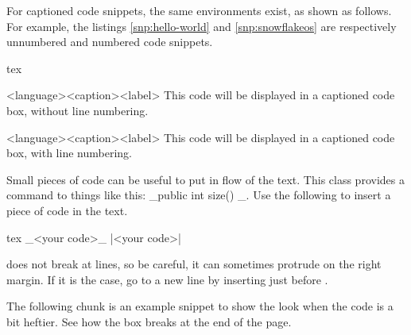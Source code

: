 \documentclass[
	raggedright,
	twoside,
	12pt,
	colorful,
]{tufte-style-article}
\begin{document}
For captioned code snippets, the same environments exist, as shown as follows. For example, the listings \ref{snp:hello-world} and \ref{snp:snowflakeos} are respectively unnumbered and numbered code snippets.

\begin{codebox}{tex}
\begin{snippet}{<language>}{<caption>}{<label>}
This code will be displayed in a captioned code box, without line numbering.
\end{snippet}

\begin{snippetnum}{<language>}{<caption>}{<label>}
This code will be displayed in a captioned code box, with line numbering.
\end{snippetnum}
\end{codebox}

Small pieces of code can be useful to put in flow of the text. This class provides a command to things like this: _public int size() {}_. Use the following to insert a piece of code in the text.


\begin{codebox}{tex}
_<your code>_ %
|<your code>|
\end{codebox}

 does not break at lines, so be careful, it can sometimes protrude on the right margin. If it is the case, go to a new line by inserting  just before .


The following chunk is an example snippet to show the look when the code is a bit heftier. See how the box breaks at the end of the page.
\end{document}
